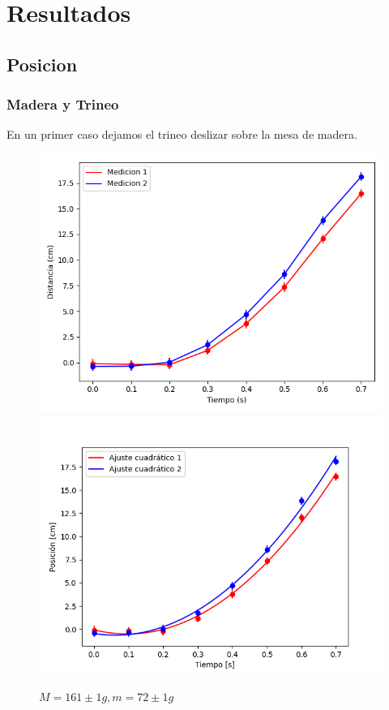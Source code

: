 \documentclass[12pt,a4]{article}
\begin{document}
\newpage

\section{Resultados}

\subsection{Posicion}

\subsubsection*{Madera y Trineo}

En un primer caso dejamos el trineo deslizar sobre la mesa de madera. \\

\begin{figure}[H]
    \centering
    \includegraphics[width=0.4\linewidth]{TiempoVsDistanciaPisoMadera2PB_O.png}
    \includegraphics[width=0.44\linewidth]{ajuste2_PisoMadera2PB_O.png}
    \caption{$M = 161 \pm 1 g, m = 72 \pm 1 g$}
    \label{fig:2PB_O piso trineo}

\end{figure}
\end{document}
